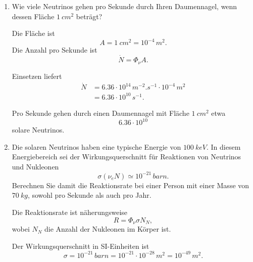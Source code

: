\documentclass[11pt,a4paper]{scrartcl}
\begin{document}
\begin{enumerate}[label=(\alph*)]
        \item
            Wie viele Neutrinos gehen pro Sekunde durch Ihren Daumennagel, wenn dessen Fläche
            \(\SI{1}{cm^2}\) beträgt?

            \begin{calculationbox}
                Die Fläche ist
                \[
                    A=\SI{1}{cm^2}=10^{-4}\,\si{m^2}.
                \]
                Die Anzahl pro Sekunde ist
                \[
                    \dot N=\Phi_\nu A.
                \]

                \begin{calculationbox}
                    Einsetzen liefert
                    \begin{align*}
                        \dot N
                        &=6.36\cdot10^{14}\,\si{m^{-2}.s^{-1}}\cdot10^{-4}\,\si{m^2}\\
                        &=6.36\cdot10^{10}\,\si{s^{-1}}.
                    \end{align*}
                \end{calculationbox}
            \end{calculationbox}

            \begin{answerbox}
                Pro Sekunde gehen durch einen Daumennagel mit Fläche \(\SI{1}{cm^2}\) etwa
                \[
                    \boxed{6.36\cdot10^{10}}
                \]
                solare Neutrinos.
            \end{answerbox}

        \item
            Die solaren Neutrinos haben eine typische Energie von \(\SI{100}{keV}\).
            In diesem Energiebereich sei der Wirkungsquerschnitt für Reaktionen von
            Neutrinos und Nukleonen
            \[
                \sigma(\nu_eN)\simeq10^{-21}\,\si{barn}.
            \]
            Berechnen Sie damit die Reaktionsrate bei einer Person mit einer Masse von
            \(\SI{70}{kg}\), sowohl pro Sekunde als auch pro Jahr.

            \begin{calculationbox}
                Die Reaktionsrate ist näherungsweise
                \[
                    R=\Phi_\nu\sigma N_N,
                \]
                wobei $N_N$ die Anzahl der Nukleonen im Körper ist.

                \begin{calculationbox}
                    Der Wirkungsquerschnitt in SI-Einheiten ist
                    \[
                        \sigma=10^{-21}\,\si{barn}
                        =10^{-21}\cdot10^{-28}\,\si{m^2}
                        =10^{-49}\,\si{m^2}.
                    \]
                \end{calculationbox}


\end{calculationbox}
\end{enumerate}
\end{document}
